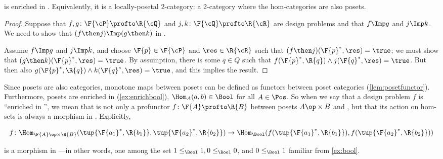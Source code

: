 \begin{proposition}
	\label{prop:DP_loc_pos}
	\DP is enriched in \Pos.
	Equivalently, it is a locally-posetal 2-category: a 2-category where the hom-categories are also posets.
\end{proposition}
\begin{proof}
	Suppose that $f,g\colon \F{\cP} \profto \R{\cQ}$ and $j,k\colon \F{\cQ} \profto \R{\cR}$ are design problems and that $f\Imp g$ and $j\Imp k$.
	We need to show that $(f\then j)\Imp(g\then k)$ in \DP.
	\begin{center}
	\end{center}
	Assume $f\Imp g$ and $j\Imp k$, and choose $\F{p}\in\F{\cP} $ and $\res\in\R{\cR}$ such that $(f\then j)(\F{p}^*,\res)=\true$; we must show that $(g \then k)(\F{p}^*,\res)=\true$.
	By assumption, there is some $q\in Q$ such that $f(\F{p}^*,\R{q})\wedge j(\F{q}^*,\res)=\true$.
	But then also $g(\F{p}^*,\R{q})\wedge k(\F{q}^*,\res)=\true$, and this implies the result.
\end{proof}

Since posets are also categories, monotone maps between posets can be defined as functors between poset categories (\cref{lem:posetfunctor}).
Furthermore, posets are enriched in \Bool (\cref{ex:enrichbool}), \ie  $\Hom_A(a,b) \in \Bool$ for all $A \in \Pos$.
So when we say that a design problem $f$ is ``enriched in \Bool'', we mean that is not only a profunctor $f \colon \F{A} \profto \R{B}$ between posets $A\op \times B$ and \Bool, but that its action on hom-sets is always a morphism in \Bool.
Explicitly,
\begin{widepar}
	\begin{equation*}
		f \colon \Hom_{\F{A}\op \times \R{B}}(\tup{\F{a_1}^*,\R{b_1}}, \tup{\F{a_2}^*,\R{b_2}}) \to \Hom_\Bool(f(\tup{\F{a_1}^*,\R{b_1}}), f(\tup{\F{a_2}^*,\R{b_2}}))
	\end{equation*}
\end{widepar}
is a morphism in \Bool---in other words, one among the set $1 \leq_\Bool 1, 0 \leq_\Bool 0$, and $0 \leq_\Bool 1$ familiar from \cref{ex:bool}.


